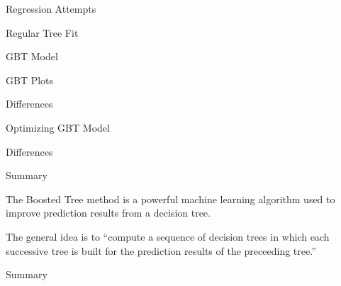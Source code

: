\documentclass[ignorenonframetext,]{beamer}
\begin{document}
\begin{frame}{Regression Attempts}

\end{frame}

\begin{frame}{Regular Tree Fit}

\end{frame}

\begin{frame}{GBT Model}

\end{frame}

\begin{frame}{GBT Plots}

\end{frame}

\begin{frame}{Differences}

\end{frame}

\begin{frame}{Optimizing GBT Model}

\end{frame}

\begin{frame}{Differences}

\end{frame}

\begin{frame}{Summary}

The Boosted Tree method is a powerful machine learning algorithm used to
improve prediction results from a decision tree.

The general idea is to ``compute a sequence of decision trees in which
each successive tree is built for the prediction results of the
preceeding tree.''

\end{frame}

\begin{frame}{Summary}

\end{frame}
\end{document}
